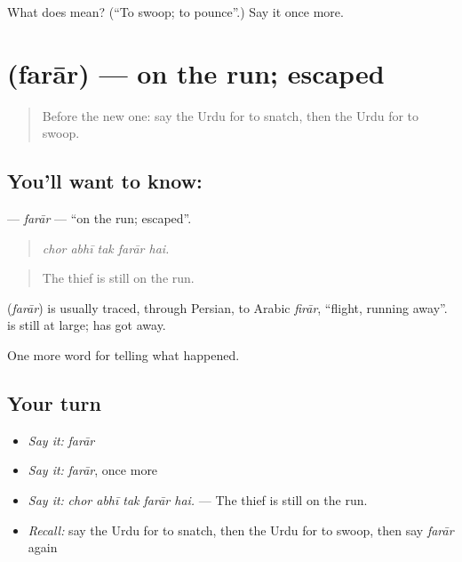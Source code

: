 \begin{tcolorbox}[breakable,colback=teal!4,colframe=teal!35!black,title={Before you move on}]
What does  mean? (\textquotedblleft{}To swoop; to pounce\textquotedblright{}.) Say it once more.
\end{tcolorbox}
\section[\texorpdfstring{\ur{فرار} (farār)}{فرار (farār)}]{ (farār) — on the run; escaped}

\label{lesson:UR-C277-farar}



\begin{quote}
Before the new one: say the Urdu for to snatch, then the Urdu for to swoop.
\end{quote}

\subsection*{You'll want to know: }
\textbf{} — \emph{farār} — \textquotedblleft{}on the run; escaped\textquotedblright{}.

\begin{quote}
    
\end{quote}

\begin{quote}
\emph{chor abhī tak farār hai.}
\end{quote}

\begin{quote}
The thief is still on the run.
\end{quote}

\begin{cousinweb}
\textbf{} (\emph{farār}) is usually traced, through Persian, to Arabic \emph{firār}, \textquotedblleft{}flight, running away\textquotedblright{}. \textbf{ } is still at large; \textbf{  } has got away.
\end{cousinweb}

\begin{grammarlens}[title={What you've built}]
One more word for telling what happened.
\end{grammarlens}

\subsection*{Your turn}
\begin{itemize}
\raggedright
  \item \emph{Say it:} \emph{farār}
  \item \emph{Say it:} \emph{farār}, once more
  \item \emph{Say it:} \emph{chor abhī tak farār hai.} — The thief is still on the run.
  \item \emph{Recall:} say the Urdu for to snatch, then the Urdu for to swoop, then say \emph{farār} again
\end{itemize}

